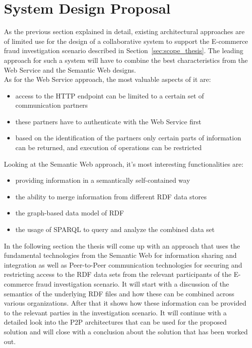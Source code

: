 
\section{System Design Proposal}
\label{sec:design_proposal}

As the previous section explained in detail, existing architectural approaches are of limited use for the design of a collaborative system to support the \gls{E-commerce} fraud investigation scenario described in Section~\ref{sec:scope_thesis}. The leading approach for such a system will have to combine the best characteristics from the Web Service and the Semantic Web designs. \\

As for the Web Service approach, the most valuable aspects of it are: \@

\begin{itemize}
	\item access to the \gls{HTTP} endpoint can be limited to a certain set of communication partners
	\item these partners have to authenticate with the Web Service first
	\item based on the identification of the partners only certain parts of information can be returned, and execution of operations can be restricted
\end{itemize}

Looking at the Semantic Web approach, it's most interesting functionalities are: \@

\begin{itemize}
	\item providing information in a semantically self-contained way
	\item the ability to merge information from different \gls{RDF} data stores
	\item the graph-based data model of \gls{RDF}
	\item the usage of \gls{SPARQL} to query and analyze the combined data set
\end{itemize}

In the following section the thesis will come up with an approach that uses the fundamental technologies from the Semantic Web for information sharing and integration as well as Peer-to-Peer communication technologies for securing and restricting access to the \gls{RDF} data sets from the relevant participants of the \gls{E-commerce} fraud investigation scenario. It will start with a discussion of the semantics of the underlying \gls{RDF} files and how these can be combined across various organizations. After that it shows how these information can be provided to the relevant parties in the investigation scenario. It will continue with a detailed look into the \gls{P2P} architectures that can be used for the proposed solution and will close with a conclusion about the solution that has been worked out.


